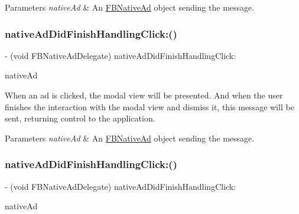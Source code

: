 \begin{DoxyParams}{Parameters}
{\em native\+Ad} & An \hyperlink{interfaceFBNativeAd}{F\+B\+Native\+Ad} object sending the message. \\
\hline
\end{DoxyParams}
\mbox{\label{protocolFBNativeAdDelegate_01-p_a94d3846b43d38539da5f28804f75da70}} 
\subsubsection{\texorpdfstring{native\+Ad\+Did\+Finish\+Handling\+Click\+:()}{nativeAdDidFinishHandlingClick:()}\hspace{0.1cm}{\footnotesize\ttfamily [4/5]}}
{\footnotesize\ttfamily -\/ (void F\+B\+Native\+Ad\+Delegate) native\+Ad\+Did\+Finish\+Handling\+Click\+: \begin{DoxyParamCaption}\item[{(\hyperlink{interfaceFBNativeAd}{F\+B\+Native\+Ad} $\ast$)}]{native\+Ad }\end{DoxyParamCaption}}

When an ad is clicked, the modal view will be presented. And when the user finishes the interaction with the modal view and dismiss it, this message will be sent, returning control to the application.


\begin{DoxyParams}{Parameters}
{\em native\+Ad} & An \hyperlink{interfaceFBNativeAd}{F\+B\+Native\+Ad} object sending the message. \\
\hline
\end{DoxyParams}
\mbox{\label{protocolFBNativeAdDelegate_01-p_a94d3846b43d38539da5f28804f75da70}} 
\subsubsection{\texorpdfstring{native\+Ad\+Did\+Finish\+Handling\+Click\+:()}{nativeAdDidFinishHandlingClick:()}\hspace{0.1cm}{\footnotesize\ttfamily [5/5]}}
{\footnotesize\ttfamily -\/ (void F\+B\+Native\+Ad\+Delegate) native\+Ad\+Did\+Finish\+Handling\+Click\+: \begin{DoxyParamCaption}\item[{(\hyperlink{interfaceFBNativeAd}{F\+B\+Native\+Ad} $\ast$)}]{native\+Ad }\end{DoxyParamCaption}}

